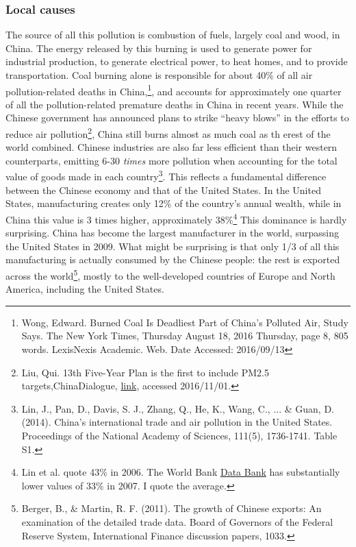 \documentclass[amstex,12pt]{book}
\begin{document}
\subsubsection{Local causes}
The source of all this pollution is combustion of fuels, largely coal and wood, in China. The energy released by this burning is used to generate power for industrial production, to generate electrical power, to heat homes, and to provide transportation. Coal burning alone is responsible for about 40\% of all air pollution-related deaths in China,\footnote{Wong, Edward. Burned Coal Is Deadliest Part of China's Polluted Air, Study Says. The New York Times, Thursday August 18, 2016 Thursday, page 8, 805 words. LexisNexis Academic. Web. Date Accessed: 2016/09/13}, and accounts for approximately one quarter of all the pollution-related premature deaths in China in recent years. While the Chinese government has announced plans to strike ``heavy blows'' in the efforts to reduce air pollution\footnote{Liu, Qui. 13th Five-Year Plan is the first to include PM2.5 targets,ChinaDialogue, \href{https://www.chinadialogue.net/article/show/single/en/8696-13th-Five-Year-Plan-is-the-first-to-include-PM2-5-targets}{link}, accessed 2016/11/01.}, China still burns almost as much coal as th erest of the world combined. Chinese industries are also far less efficient than their western counterparts, emitting 6-30 \emph{times} more pollution when accounting for the total value of goods made in each country\footnote{Lin, J., Pan, D., Davis, S. J., Zhang, Q., He, K., Wang, C., ... \& Guan, D. (2014). China’s international trade and air pollution in the United States. Proceedings of the National Academy of Sciences, 111(5), 1736-1741. Table S1.}. This reflects a fundamental difference between the Chinese economy and that of the United States. In the United States, manufacturing creates only 12\% of the country's annual wealth, while in China this value is 3 times higher, approximately 38\%\footnote{Lin et al. quote 43\% in 2006. The World Bank \href{http://databank.worldbank.org/data/reports.aspx?source=2&series=NV.IND.MANF.ZS&country=}{Data Bank} has substantially lower values of 33\% in 2007. I quote the average.} This dominance is hardly surprising. China has become the largest manufacturer in the world, surpassing the United States in 2009. What might be surprising is that only 1/3 of all this manufacturing is actually consumed by the Chinese people: the rest is exported across the world\footnote{Berger, B., \& Martin, R. F. (2011). The growth of Chinese exports: An examination of the detailed trade data. Board of Governors of the Federal Reserve System, International Finance discussion papers, 1033.}, mostly to the well-developed countries of Europe and North America, including the United States.
\end{document}
